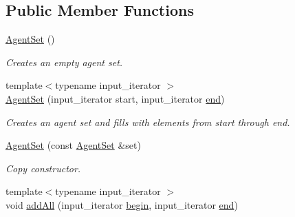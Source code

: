 \subsection*{Public Member Functions}
\begin{DoxyCompactItemize}
\item 
\hypertarget{classrepast_1_1relogo_1_1_agent_set_a57e45513bb2fee478ceba906c563fa42}{\hyperlink{classrepast_1_1relogo_1_1_agent_set_a57e45513bb2fee478ceba906c563fa42}{Agent\-Set} ()}\label{classrepast_1_1relogo_1_1_agent_set_a57e45513bb2fee478ceba906c563fa42}

\begin{DoxyCompactList}\small\item\em Creates an empty agent set. \end{DoxyCompactList}\item 
\hypertarget{classrepast_1_1relogo_1_1_agent_set_ad05a9d50cb9c512fd399758fa3d141f0}{{\footnotesize template$<$typename input\-\_\-iterator $>$ }\\\hyperlink{classrepast_1_1relogo_1_1_agent_set_ad05a9d50cb9c512fd399758fa3d141f0}{Agent\-Set} (input\-\_\-iterator start, input\-\_\-iterator \hyperlink{classrepast_1_1relogo_1_1_agent_set_ab862376938b785f091c0b0720de759f3}{end})}\label{classrepast_1_1relogo_1_1_agent_set_ad05a9d50cb9c512fd399758fa3d141f0}

\begin{DoxyCompactList}\small\item\em Creates an agent set and fills with elements from start through end. \end{DoxyCompactList}\item 
\hypertarget{classrepast_1_1relogo_1_1_agent_set_a667732a4a0d7a49ca57c8f8373bb979c}{\hyperlink{classrepast_1_1relogo_1_1_agent_set_a667732a4a0d7a49ca57c8f8373bb979c}{Agent\-Set} (const \hyperlink{classrepast_1_1relogo_1_1_agent_set}{Agent\-Set} \&set)}\label{classrepast_1_1relogo_1_1_agent_set_a667732a4a0d7a49ca57c8f8373bb979c}

\begin{DoxyCompactList}\small\item\em Copy constructor. \end{DoxyCompactList}\item 
\hypertarget{classrepast_1_1relogo_1_1_agent_set_afc89da64293d944f23cb36d41e146f9e}{{\footnotesize template$<$typename input\-\_\-iterator $>$ }\\void \hyperlink{classrepast_1_1relogo_1_1_agent_set_afc89da64293d944f23cb36d41e146f9e}{add\-All} (input\-\_\-iterator \hyperlink{classrepast_1_1relogo_1_1_agent_set_a9492708e0f156e29fcfa77f9477887af}{begin}, input\-\_\-iterator \hyperlink{classrepast_1_1relogo_1_1_agent_set_ab862376938b785f091c0b0720de759f3}{end})}\label{classrepast_1_1relogo_1_1_agent_set_afc89da64293d944f23cb36d41e146f9e}


\end{DoxyCompactItemize}
